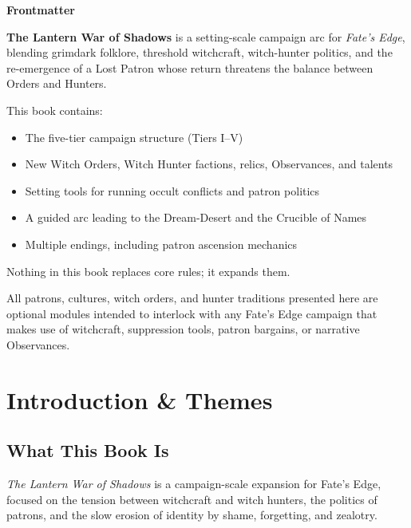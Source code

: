 \documentclass[11pt]{book}
\begin{document}
\thispagestyle{empty}
\begin{center}
\vspace*{1cm}

{\Large\bfseries Frontmatter}

\vspace{1cm}

\begin{minipage}{0.85\textwidth}
\small

\textbf{The Lantern War of Shadows} is a setting-scale campaign arc for \emph{Fate's Edge}, blending
grimdark folklore, threshold witchcraft, witch-hunter politics, and the re-emergence of a Lost Patron
whose return threatens the balance between Orders and Hunters.

This book contains:
\begin{itemize}[noitemsep]
    \item The five-tier campaign structure (Tiers I--V)
    \item New Witch Orders, Witch Hunter factions, relics, Observances, and talents
    \item Setting tools for running occult conflicts and patron politics
    \item A guided arc leading to the Dream-Desert and the Crucible of Names
    \item Multiple endings, including patron ascension mechanics
\end{itemize}

Nothing in this book replaces core rules; it expands them.

All patrons, cultures, witch orders, and hunter traditions presented here are optional
modules intended to interlock with any Fate's Edge campaign that makes use of witchcraft,
suppression tools, patron bargains, or narrative Observances.

\end{minipage}

\end{center}
\newpage
\setcounter{page}{1}

\section{Introduction \& Themes}

\subsection{What This Book Is}
\emph{The Lantern War of Shadows} is a campaign-scale expansion for Fate's Edge, 
focused on the tension between witchcraft and witch hunters, the politics of patrons, 
and the slow erosion of identity by shame, forgetting, and zealotry.
\end{document}
